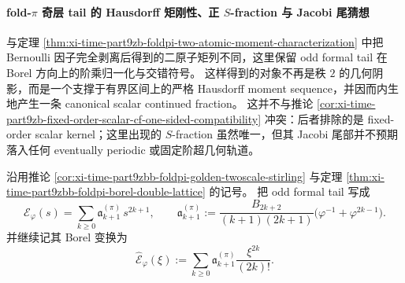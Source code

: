 \paragraph{fold-\texorpdfstring{$\pi$}{pi} 奇层 tail 的 Hausdorff 矩刚性、正 \texorpdfstring{$S$}{S}-fraction 与 Jacobi 尾猜想}
与定理 \ref{thm:xi-time-part9zb-foldpi-two-atomic-moment-characterization} 中把 Bernoulli 因子完全剥离后得到的二原子矩列不同，这里保留 odd formal tail 在 Borel 方向上的阶乘归一化与交错符号。
这样得到的对象不再是秩 \(2\) 的几何阴影，而是一个支撑于有界区间上的严格 Hausdorff moment sequence，并因而内生地产生一条 canonical scalar continued fraction。
这并不与推论 \ref{cor:xi-time-part9zb-fixed-order-scalar-cf-one-sided-compatibility} 冲突：后者排除的是 fixed-order scalar kernel；这里出现的 \(S\)-fraction 虽然唯一，但其 Jacobi 尾部并不预期落入任何 eventually periodic 或固定阶超几何轨道。

沿用推论 \ref{cor:xi-time-part9zbb-foldpi-golden-twoscale-stirling} 与定理 \ref{thm:xi-time-part9zbb-foldpi-borel-double-lattice} 的记号。
把 odd formal tail 写成
\[
\mathcal E_\varphi(s)
=
\sum_{k\ge 0}\mathfrak a_{k+1}^{(\pi)}\,s^{2k+1},
\qquad
\mathfrak a_{k+1}^{(\pi)}
:=
\frac{B_{2k+2}}{(k+1)(2k+1)}
\bigl(\varphi^{-1}+\varphi^{2k-1}\bigr).
\]
并继续记其 Borel 变换为
\[
\widehat{\mathcal E}_\varphi(\xi)
:=
\sum_{k\ge 0}
\mathfrak a_{k+1}^{(\pi)}
\frac{\xi^{2k}}{(2k)!}.
\]

